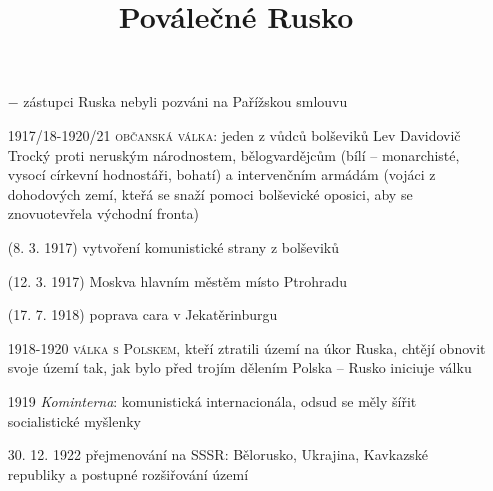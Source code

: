 \documentclass{article}
\title{\vspace{-2cm}Poválečné Rusko\vspace{-1.7cm}}
\date{}
\author{}
\begin{document}
\maketitle

\begin{itemize}
    \vspace{-0.5em}
    \setlength\itemsep{0.15em}
    \item[$-$] zástupci Ruska nebyli pozváni na Pařížskou smlouvu
    \item[1917/18-1920/21] \textsc{občanská válka}: jeden z vůdců bolševiků Lev Davidovič Trocký proti neruským národnostem, bělogvardějcům (bílí -- monarchisté, vysocí církevní hodnostáři, bohatí) a intervenčním armádám (vojáci z dohodových zemí, kteřá se snaží pomoci bolševické oposici, aby se znovuotevřela východní fronta)
    \item[(8. 3. 1917)] vytvoření komunistické strany z bolševiků
    \item[(12. 3. 1917)] Moskva hlavním městěm místo Ptrohradu
    \item[(17. 7. 1918)] poprava cara v Jekatěrinburgu
    \item[1918-1920] \textsc{válka s Polskem}, kteří ztratili území na úkor Ruska, chtějí obnovit svoje území tak, jak bylo před trojím dělením Polska -- Rusko iniciuje válku
    \item[1919] \textit{Kominterna}: komunistická internacionála, odsud se měly šířit socialistické myšlenky
    \item[30. 12. 1922] přejmenování na SSSR: Bělorusko, Ukrajina, Kavkazské republiky a postupné rozšiřování území
\end{itemize}
\end{document}
